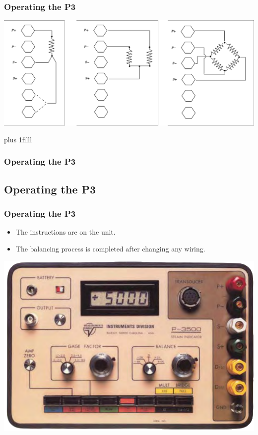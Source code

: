 \documentclass[fleqn]{beamer} %
\newcommand{\sectionIIIsubsectionIIItitle}{Operating the P3}
\newcommand{\btVFill}{\vskip0pt plus 1filll}
\begin{document}
			\begin{frame}
				\frametitle{\sectionIIIsubsectionIIItitle}

				\bigskip
				\includegraphics[scale=.22]{images/quarter_half_full.png}

				\btVFill
				
			\end{frame}

			\begin{frame}
				\frametitle{\sectionIIIsubsectionIIItitle}



			\end{frame}

		\subsection{\sectionIIIsubsectionIIItitle}\label{sectionIIIsubsectionIII}	

			\begin{frame}[containsverbatim]
				\frametitle{\sectionIIIsubsectionIIItitle}\scriptsize


				\begin{itemize}

					\item The instructions are on the unit. 

					\item The balancing process is completed after changing any wiring. 

				\end{itemize}

				\includegraphics[scale=.228]{images/p3500_fig1.png}

			\end{frame}
\end{document}
